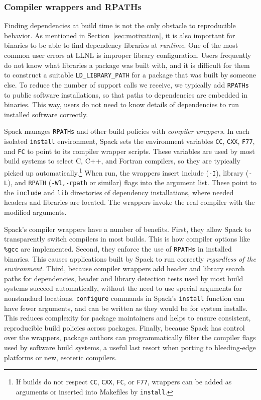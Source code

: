 \subsubsection{Compiler wrappers and RPATHs}
Finding dependencies at build time is not the only obstacle to reproducible
behavior.  As mentioned in Section~\ref{sec:motivation}, it is also important
for binaries to be able to find dependency libraries at {\it runtime}.
One of the most common user errors at LLNL is improper library configuration.
Users frequently do not know what libraries a package was built with, and
it is difficult for them to construct a suitable {\tt LD\_LIBRARY\_PATH} for
a package that was built by someone else.  To reduce the number of support calls
we receive,
we typically add {\tt RPATHs} to public software installations, so that paths
to dependencies are embedded in binaries. This way, users do not need to know
details of dependencies to run installed software correctly.

Spack manages {\tt RPATHs} and other build policies with
{\it compiler wrappers}.
In each isolated {\tt install} environment, Spack sets the environment variables
{\tt CC}, {\tt CXX}, {\tt F77}, and {\tt FC} to point to its compiler
wrapper scripts.  These variables are used by most build systems to select
C, C++, and Fortran compilers, so they are typically picked up
automatically.\footnote{If builds do not respect {\tt CC}, {\tt CXX}, {\tt FC},
or {\tt F77},
wrappers can be added as arguments or inserted into Makefiles
by {\tt install}.}
When run, the wrappers insert include ({\tt -I}), library ({\tt -L}), and
{\tt RPATH} ({\tt -Wl,-rpath} or similar) flags into the argument list.
These point to the {\tt include} and {\tt lib} directories of dependency
installations, where needed headers and libraries are located.
The wrappers invoke the real compiler with the modified arguments.

Spack's compiler wrappers have a number of benefits.  First, they allow
Spack to transparently switch compilers in most builds.  This is how
compiler options like {\tt \%gcc} are implemented.  Second, they enforce the
use of {\tt RPATHs} in
installed binaries.  This causes applications built by Spack to run correctly
{\it regardless of the environment}.  Third, because compiler wrappers add
header and library search paths for dependencies, header and library detection
tests used by most build systems succeed automatically, without
the need to use special arguments for nonstandard locations.  {\tt configure}
commands in Spack's {\tt install} function can have fewer arguments, and can
be written as they would be for system installs.  This reduces complexity
for package maintainers and helps to ensure consistent, reproducible
build policies across packages.  Finally, because Spack has control over the
wrappers, package authors can programmatically filter the compiler flags
used by software build systems, a useful last resort when porting to
bleeding-edge platforms or new, esoteric compilers.

